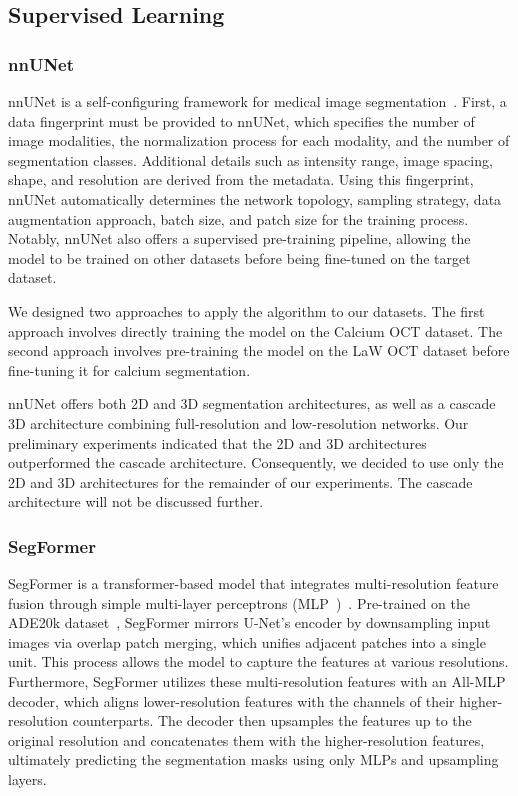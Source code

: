 \documentclass[a4paper,11pt,oneside]{report}
\begin{document}
\subsection{Supervised Learning}
\subsubsection{nnUNet}\label{sec:design:nnunet}
nnUNet is a self-configuring framework for medical image segmentation~\cite{Isensee2020}. First, a data fingerprint must be provided to nnUNet, which specifies the number of image modalities, the normalization process for each modality, and the number of segmentation classes. Additional details such as intensity range, image spacing, shape, and resolution are derived from the metadata. Using this fingerprint, nnUNet automatically determines the network topology, sampling strategy, data augmentation approach, batch size, and patch size for the training process. Notably, nnUNet also offers a supervised pre-training pipeline, allowing the model to be trained on other datasets before being fine-tuned on the target dataset.

We designed two approaches to apply the algorithm to our datasets. The first approach involves directly training the model on the Calcium OCT dataset. The second approach involves pre-training the model on the LaW OCT dataset before fine-tuning it for calcium segmentation. 

nnUNet offers both 2D and 3D segmentation architectures, as well as a cascade 3D architecture combining full-resolution and low-resolution networks. Our preliminary experiments indicated that the 2D and 3D architectures outperformed the cascade architecture. Consequently, we decided to use only the 2D and 3D architectures for the remainder of our experiments. The cascade architecture will not be discussed further.

\subsubsection{SegFormer}
SegFormer is a transformer-based model that integrates multi-resolution feature fusion through simple multi-layer perceptrons (MLP~\cite{Rumelhart1986})~\cite{Xie2021SegFormer}. Pre-trained on the ADE20k dataset~\cite{Zhou2018}, SegFormer mirrors U-Net's encoder by downsampling input images via overlap patch merging, which unifies adjacent patches into a single unit. This process allows the model to capture the features at various resolutions. Furthermore, SegFormer utilizes these multi-resolution features with an All-MLP decoder, which aligns lower-resolution features with the channels of their higher-resolution counterparts. The decoder then upsamples the features up to the original resolution and concatenates them with the higher-resolution features, ultimately predicting the segmentation masks using only MLPs and upsampling layers. 
\end{document}
